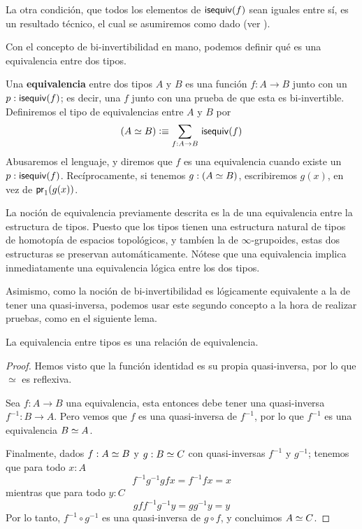 \documentclass[../main.tex]{subfiles}
\begin{document}
La otra condici\'on, que todos los elementos de $\mathsf{isequiv}(f)$ sean iguales entre s\'i, es un resultado t\'ecnico, el cual se asumiremos como dado (ver \cite[Secci\'on 4.3]{the_univalent_foundations_program_homotopy_2013}).

Con el concepto de bi-invertibilidad en mano, podemos definir qu\'e es una equivalencia entre dos tipos.

\begin{definition}
  Una \textbf{equivalencia} entre dos tipos $A$ y $B$ es una función $f: A \to B$ junto con un $p: \mathsf{isequiv}(f)$; es decir, una $f$ junto con una prueba de que esta es bi-invertible.
  Definiremos el tipo de equivalencias entre $A$ y $B$ por
  \[ (\eqv A B) \defeq \sm{f:A\to B} \isequiv(f)\]
  Abusaremos el lenguaje, y diremos que $f$ es una equivalencia cuando existe un $p: \mathsf{isequiv}(f)$. Rec\'iprocamente, si tenemos $g:(A \simeq B)$, escribiremos $g(x)$, en vez de $\mathsf{pr}_{1} (g (x))$.
\end{definition}

La noción de equivalencia previamente descrita es la de una equivalencia entre la estructura de tipos.
Puesto que los tipos tienen una estructura natural de tipos de homotop\'ia de espacios topol\'ogicos, y tamb\'ien la de $\infty$-grupoides, estas dos estructuras se preservan autom\'aticamente.
N\'otese que una equivalencia implica inmediatamente una equivalencia l\'ogica entre los dos tipos.

Asimismo, como la noci\'on de bi-invertibilidad es l\'ogicamente equivalente a la de tener una quasi-inversa, podemos usar este segundo concepto a la hora de realizar pruebas, como en el siguiente lema.

\begin{lemma}
  La equivalencia entre tipos es una relaci\'on de equivalencia.
\end{lemma}
\begin{proof}
  Hemos visto que la función identidad es su propia quasi-inversa, por lo que $\simeq$ es reflexiva.

  Sea $f:A \to B$ una equivalencia, esta entonces debe tener una quasi-inversa $f^{-1}:B\to A$.
  Pero vemos que $f$ es una quasi-inversa de $f^{-1}$, por lo que $f^{-1}$ es una equivalencia $B \simeq A$.

  Finalmente, dados $f:A \simeq B$ y $g:B \simeq C$ con quasi-inversas $f^{-1}$ y $g^{-1}$; tenemos que para todo $x:A$
  \[ f^{-1} g^{-1} g f x = f^{-1} f x = x\]
  mientras que para todo $y:C$
  \[ g f f^{-1} g^{-1} y = g g^{-1} y = y\]
  Por lo tanto, $f^{-1} \circ g^{-1}$ es una quasi-inversa de $g\circ f$, y concluimos $A \simeq C$.
\end{proof}
\end{document}
